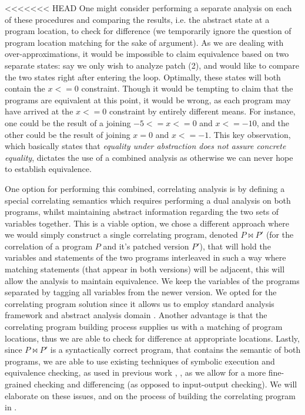 <<<<<<< HEAD
One might consider performing a separate analysis on each of these procedures and comparing the results, i.e. the abstract state at a program location, to check for difference (we temporarily ignore the question of program location matching for the sake of argument). As we are dealing with over-approximations, it would be impossible to claim equivalence based on two separate states: say we only wish to analyze patch (2), and would like to compare the two states right after entering the loop. Optimally, these states will both contain the ${x<=0}$ constraint. Though it would be tempting to claim that the programs are equivalent at this point, it would be wrong, as each program may have arrived at the ${x<=0}$ constraint by entirely different means. For instance, one could be the result of a joining ${-5<=x<=0}$ and ${x<=-10}$, and the other could be the result of joining ${x=0}$ and ${x<=-1}$. This key observation, which basically states that \emph{equality under abstraction does not assure concrete equality}, dictates the use of a combined analysis as otherwise we can never hope to establish equivalence.

One option for performing this combined, correlating analysis is by defining a special correlating semantics which requires performing a dual analysis on both programs, whilst maintaining abstract information regarding the two sets of variables together. This is a viable option, we chose a different approach where we would simply construct a single correlating program, denoted $P \bowtie P'$ (for the correlation of a program $P$ and it's patched version $P'$), that will hold the variables and statements of the two programs interleaved in such a way where matching statements (that appear in both versions) will be adjacent, this will allow the analysis to maintain equivalence. We keep the variables of the programs separated by tagging all variables from the newer version. We opted for the correlating program solution since it allows us to employ standard analysis framework \cite{CLang} and abstract analysis domain \cite{JeannetMine09}. Another advantage is that the correlating program building process supplies us with a matching of program locations, thus we are able to check for difference at appropriate locations. Lastly, since $P \bowtie P'$ is a syntactically correct program, that contains the semantic of both programs, we are able to use existing techniques of symbolic execution and equivalence checking, as used in previous work \cite{GodlinStrichman09,DwyerElbaumPerson08,EnglerRamos11}, , as we allow for a more fine-grained checking and differencing (as opposed to input-output checking). We will elaborate on these issues, and on the process of building the correlating program in .

